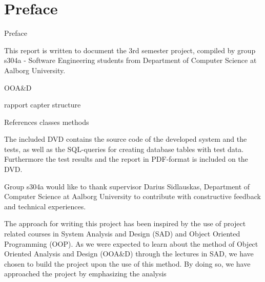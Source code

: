 \chapter*{Preface}
\label{chap:preface}


Preface

This report is written to document the 3rd semester project, compiled by group s304a
- Software Engineering students from Department of Computer Science at Aalborg
University. 

OOA\&D

rapport capter structure

References
classes
methods

The included DVD contains the source code of the developed system and the tests, as
well as the SQL-queries for creating database tables with test data. Furthermore the test
results and the report in PDF-format is included on the DVD.

Group s304a would like to thank supervisor Darius Sidlauskas, Department of Computer
Science at Aalborg University to contribute with constructive feedback and technical
experiences.

The approach for writing this project has been inspired by the use of project related
courses in System Analysis and Design (SAD) and Object Oriented Programming (OOP).
As we were expected to learn about the method of Object Oriented Analysis and Design
(OOA\&D) through the lectures in SAD, we have chosen to build the project upon the use
of this method. By doing so, we have approached the project by emphasizing the analysis


